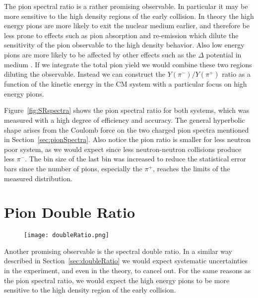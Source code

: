 The pion spectral ratio is a rather promising observable. In particular it may be more sensitive to the high density regions of the early collision. In theory the high energy pions are more likely to exit the nuclear medium earlier, and therefore be less prone to effects such as pion absorption and re-emission which dilute the sensitivity of the pion observable to the high density behavior. Also low energy pions are more likely to be affected by other effects such as the $\Delta$ potential in medium \cite{baoan_deltapotential}. If we integrate the total pion yield we would combine these two regions diluting the observable. Instead we can construct the $Y(\pi^-)/Y(\pi^+)$ ratio as a function of the kinetic energy in the CM system with a particular focus on high energy pions.


Figure~\ref{fig:SRspectra} shows the pion spectral ratio for both systems, which was measured with a high degree of efficiency and accuracy. The general hyperbolic shape arises from the Coulomb force on the two charged pion spectra mentioned in Section~\ref{sec:pionSpectra}. Also notice the pion ratio is smaller for less neutron poor system, as we would expect since less neutron-neutron collisions produce less $\pi^-$. The bin size of the last bin was increased to reduce the statistical error bars since the number of pions, especially the $\pi^+$, reaches the limits of the measured distribution. 




\section{Pion Double Ratio}

\begin{figure}[!htb]
\centering
\texttt{[image: doubleRatio.png]}
\caption{}
\label{fig:spectraDR}
\end{figure}

Another promising observable is the spectral double ratio. In a similar way described in Section~\ref{sec:doubleRatio} we would expect systematic uncertainties in the experiment, and even in the theory, to cancel out. For the same reasons as the pion spectral ratio, we would expect the high energy pions to be more sensitive to the high density region of the early collision. 



